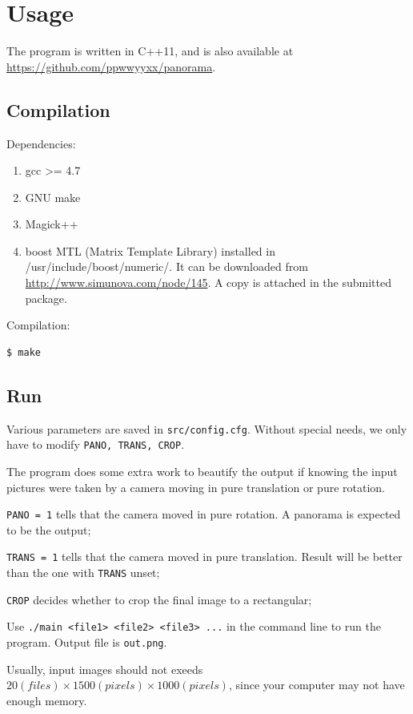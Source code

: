 \section{Usage}
The program is written in C++11, and is also available at \url{https://github.com/ppwwyyxx/panorama}.

\subsection{Compilation}
Dependencies:

\begin{enumerate}
    \item gcc >= 4.7
    \item GNU make
    \item Magick++
    \item boost MTL (Matrix Template Library) installed in /usr/include/boost/numeric/.
      It can be downloaded from \url{http://www.simunova.com/node/145}. A copy is attached in the submitted package.
\end{enumerate}

Compilation:
\begin{lstlisting}
$ make
\end{lstlisting}

\subsection{Run}
Various parameters are saved in \verb|src/config.cfg|.
Without special needs, we only have to modify \verb|PANO, TRANS, CROP|.

The program does some extra work to beautify the output
if knowing the input pictures were taken by a camera
moving in pure translation or pure rotation.

\verb|PANO = 1| tells that the camera moved in pure rotation. A panorama is expected to be the output;

\verb|TRANS = 1| tells that the camera moved in pure translation. Result will be better than the one with \verb|TRANS| unset;

\verb|CROP| decides whether to crop the final image to a rectangular;

Use \verb|./main <file1> <file2> <file3> ...| in the command line to run the program.
Output file is \verb|out.png|.

Usually, input images should not exeeds $20(files)\times 1500(pixels) \times 1000(pixels)$, since your computer may not have enough memory.

